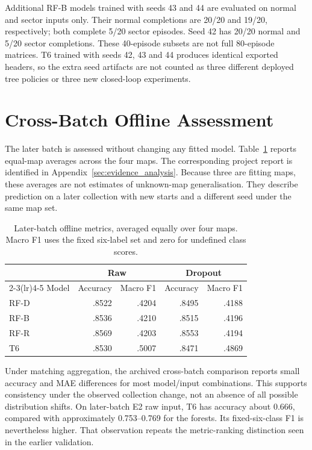 Additional RF-B models trained with seeds 43 and 44 are evaluated on normal
and sector inputs only. Their normal completions are 20/20 and 19/20,
respectively; both complete 5/20 sector episodes. Seed 42 has 20/20 normal and
5/20 sector completions. These 40-episode subsets are not full 80-episode
matrices. T6 trained with seeds 42, 43 and 44 produces identical exported
headers, so the extra seed artifacts are not counted as three different
deployed tree policies or three new closed-loop experiments.

\section{Cross-Batch Offline Assessment}
The later batch is assessed without changing any fitted model.
Table~\ref{tab:crossbatch} reports equal-map averages across the four maps.
The corresponding project report is identified in Appendix~\ref{sec:evidence_analysis}.
Because three are fitting maps, these averages are not estimates of
unknown-map generalisation. They describe prediction on a later collection
with new starts and a different seed under the same map set.

\begin{table}[htbp]
\centering\small
\caption[Cross-batch offline assessment]{Later-batch offline metrics, averaged equally over four maps.
Macro F1 uses the fixed six-label set and zero for undefined class scores.}
\label{tab:crossbatch}
\begin{tabular}{lrrrr}
\toprule & \multicolumn{2}{c}{Raw} & \multicolumn{2}{c}{Dropout} \\
\cmidrule(lr){2-3}\cmidrule(lr){4-5}
Model & Accuracy & Macro F1 & Accuracy & Macro F1 \\\midrule
RF-D & .8522 & .4204 & .8495 & .4188 \\
RF-B & .8536 & .4210 & .8515 & .4196 \\
RF-R & .8569 & .4203 & .8553 & .4194 \\
T6 & .8530 & .5007 & .8471 & .4869 \\
\bottomrule
\end{tabular}
\end{table}

Under matching aggregation, the archived cross-batch comparison reports small
accuracy and MAE differences for most model/input combinations. This supports
consistency under the observed collection change, not an absence of all
possible distribution shifts. On later-batch E2 raw input, T6 has accuracy
about 0.666, compared with approximately 0.753--0.769 for the forests. Its
fixed-six-class F1 is nevertheless higher. That observation repeats the
metric-ranking distinction seen in the earlier validation.

